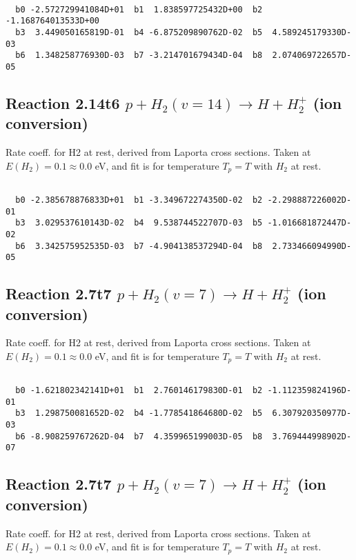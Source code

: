 \begin{small}\begin{verbatim}

  b0 -2.572729941084D+01  b1  1.838597725432D+00  b2 -1.168764013533D+00
  b3  3.449050165819D-01  b4 -6.875209890762D-02  b5  4.589245179330D-03
  b6  1.348258776930D-03  b7 -3.214701679434D-04  b8  2.074069722657D-05

\end{verbatim}\end{small}

\newpage
\subsection{
Reaction 2.14t6
$ p + H_2(v=14) \rightarrow H + H_2^+$ (ion conversion)
}
Rate coeff. for H2 at rest, derived from Laporta cross sections.
Taken at $E(H_2) = 0.1 \approx 0.0$ eV,  and fit is for temperature $T_p=T$ with $H_2$ at rest.

\begin{small}\begin{verbatim}

  b0 -2.385678876833D+01  b1 -3.349672274350D-02  b2 -2.298887226002D-01
  b3  3.029537610143D-02  b4  9.538744522707D-03  b5 -1.016681872447D-02
  b6  3.342575952535D-03  b7 -4.904138537294D-04  b8  2.733466094990D-05

\end{verbatim}\end{small}

\newpage
\subsection{
Reaction 2.7t7
$ p + H_2(v=7) \rightarrow H + H_2^+$ (ion conversion)
}
Rate coeff. for H2 at rest, derived from Laporta cross sections.
Taken at $E(H_2) = 0.1 \approx 0.0$ eV,  and fit is for temperature $T_p=T$ with $H_2$ at rest.

\begin{small}\begin{verbatim}

  b0 -1.621802342141D+01  b1  2.760146179830D-01  b2 -1.112359824196D-01
  b3  1.298750081652D-02  b4 -1.778541864680D-02  b5  6.307920350977D-03
  b6 -8.908259767262D-04  b7  4.359965199003D-05  b8  3.769444998902D-07

\end{verbatim}\end{small}

\newpage
\subsection{
Reaction 2.7t7
$ p + H_2(v=7) \rightarrow H + H_2^+$ (ion conversion)
}
Rate coeff. for H2 at rest, derived from Laporta cross sections.
Taken at $E(H_2) = 0.1 \approx 0.0$ eV,  and fit is for temperature $T_p=T$ with $H_2$ at rest.

